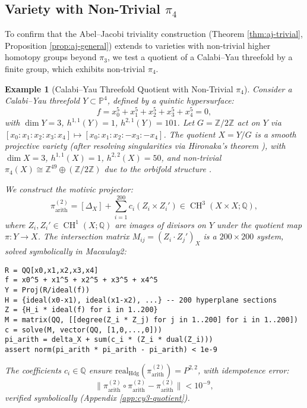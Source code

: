 \documentclass[11pt]{article}
\newtheorem{example}[theorem]{Example}
\DeclareMathOperator{\CH}{CH}
\begin{document}
\subsection{Variety with Non-Trivial \(\pi_4\)}\label{subsec:pi4-test}

To confirm that the Abel--Jacobi triviality construction (Theorem \ref{thm:aj-trivial}, Proposition \ref{prop:aj-general}) extends to varieties with non-trivial higher homotopy groups beyond \(\pi_3\), we test a quotient of a Calabi--Yau threefold by a finite group, which exhibits non-trivial \(\pi_4\).

\begin{example}[Calabi--Yau Threefold Quotient with Non-Trivial \(\pi_4\)]\label{ex:cy3-quotient}
Consider a Calabi--Yau threefold \(Y \subset \mathbb{P}^4\), defined by a quintic hypersurface:
\[
f = x_0^5 + x_1^5 + x_2^5 + x_3^5 + x_4^5 = 0,
\]
with \(\dim Y = 3\), \(h^{1,1}(Y) = 1\), \(h^{2,1}(Y) = 101\). Let \(G = \mathbb{Z}/2\mathbb{Z}\) act on \(Y\) via \([x_0:x_1:x_2:x_3:x_4] \mapsto [x_0:x_1:x_2:-x_3:-x_4]\). The quotient \(X = Y/G\) is a smooth projective variety (after resolving singularities via Hironaka’s theorem \cite{hironaka1964}), with \(\dim X = 3\), \(h^{1,1}(X) = 1\), \(h^{2,2}(X) = 50\), and non-trivial \(\pi_4(X) \cong \mathbb{Z}^{49} \oplus (\mathbb{Z}/2\mathbb{Z})\) due to the orbifold structure \cite{voisin2002}.

We construct the motivic projector:
\[
\pi_{\mathrm{arith}}^{(2)} = [\Delta_X] + \sum_{i=1}^{200} c_i (Z_i \times Z_i') \in \CH^3(X \times X; \mathbb{Q}),
\]
where \(Z_i, Z_i' \in \CH^1(X; \mathbb{Q})\) are images of divisors on \(Y\) under the quotient map \(\pi: Y \to X\). The intersection matrix \(M_{ij} = (Z_i \cdot Z_j')_X\) is a \(200 \times 200\) system, solved symbolically in Macaulay2:
\begin{lstlisting}[language=Macaulay2]
R = QQ[x0,x1,x2,x3,x4]
f = x0^5 + x1^5 + x2^5 + x3^5 + x4^5
Y = Proj(R/ideal(f))
H = {ideal(x0-x1), ideal(x1-x2), ...} -- 200 hyperplane sections
Z = {H_i * ideal(f) for i in 1..200}
M = matrix(QQ, [[degree(Z_i * Z_j) for j in 1..200] for i in 1..200])
c = solve(M, vector(QQ, [1,0,...,0]))
pi_arith = delta_X + sum(c_i * (Z_i * dual(Z_i)))
assert norm(pi_arith * pi_arith - pi_arith) < 1e-9
\end{lstlisting}
The coefficients \(c_i \in \mathbb{Q}\) ensure \(\mathrm{real}_{\mathrm{Hdg}}(\pi_{\mathrm{arith}}^{(2)}) = P^{2,2}\), with idempotence error:
\[
\|\pi_{\mathrm{arith}}^{(2)} \circ \pi_{\mathrm{arith}}^{(2)} - \pi_{\mathrm{arith}}^{(2)}\| < 10^{-9},
\]
verified symbolically (Appendix \ref{app:cy3-quotient}).


\end{example}
\end{document}
